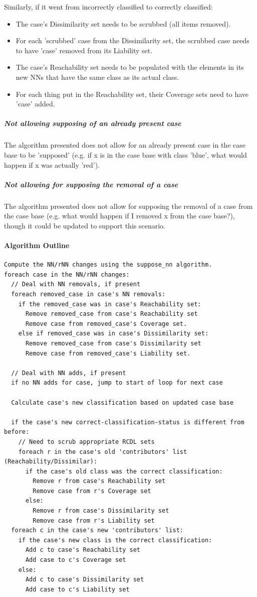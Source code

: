 \documentclass[a4paper,11pt]{report}
\begin{document}
Similarly, if it went from incorrectly classified to correctly classified:
\begin{itemize}
	\item The case's Dissimilarity set needs to be scrubbed (all items removed).
	\item For each 'scrubbed' case from the Dissimilarity set, the scrubbed case needs to have 'case' removed from its Liability set.
	\item The case's Reachability set needs to be populated with the elements in its new NNs that have the same class as its actual class.
	\item For each thing put in the Reachability set, their Coverage sets need to have 'case' added.
\end{itemize}

\subparagraph{Not allowing supposing of an already present case}
The algorithm presented does not allow for an already present case in the case base to be 'supposed' (e.g. if x is in the case base with class 'blue', what would happen if x was actually 'red').

\subparagraph{Not allowing for supposing the removal of a case}
The algorithm presented does not allow for supposing the removal of a case from the case base (e.g. what would happen if I removed x from the case base?), though it could be updated to support this scenario.
 
\paragraph{Algorithm Outline}
\begin{verbatim}
Compute the NN/rNN changes using the suppose_nn algorithm.
foreach case in the NN/rNN changes:
  // Deal with NN removals, if present
  foreach removed_case in case's NN removals:
    if the removed_case was in case's Reachability set:
      Remove removed_case from case's Reachability set
      Remove case from removed_case's Coverage set.
    else if removed_case was in case's Dissimilarity set:
      Remove removed_case from case's Dissimilarity set
      Remove case from removed_case's Liability set.

  // Deal with NN adds, if present
  if no NN adds for case, jump to start of loop for next case

  Calculate case's new classification based on updated case base
  
  if the case's new correct-classification-status is different from before:
    // Need to scrub appropriate RCDL sets
    foreach r in the case's old 'contributors' list (Reachability/Dissimilar):
      if the case's old class was the correct classification:
        Remove r from case's Reachability set
        Remove case from r's Coverage set
      else:
        Remove r from case's Dissimilarity set
        Remove case from r's Liability set
  foreach c in the case's new 'contributors' list:
    if the case's new class is the correct classification:
      Add c to case's Reachability set
      Add case to c's Coverage set
    else:
      Add c to case's Dissimilarity set
      Add case to c's Liability set

\end{verbatim}
\end{document}
